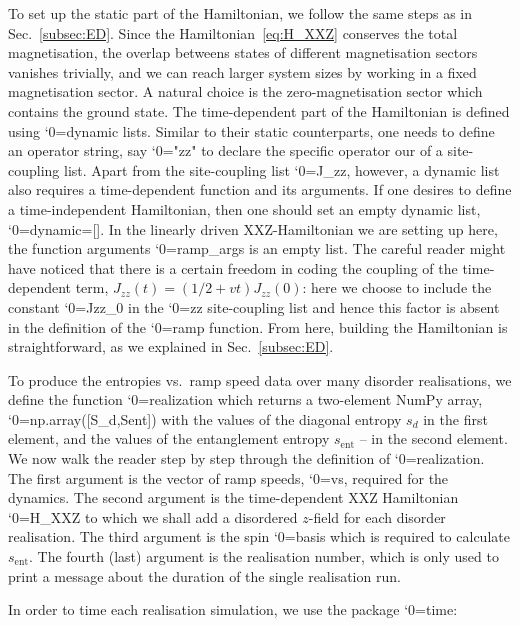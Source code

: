 \documentclass{SciPost}
\newcommand\0{\scalebox{-1}[1]{0}}
\let\svttfamily\ttfamily
\renewcommand\ttfamily{\svttfamily\catcode`0=\active }
\renewcommand\texttt{\bgroup\ttfamily\texttthelp}
\def\texttthelp#1{#1\egroup}
\begin{document}
To set up the static part of the Hamiltonian, we follow the same steps as in Sec.~\ref{subsec:ED}. Since the Hamiltonian~\eqref{eq:H_XXZ} conserves the total magnetisation, the overlap betweens states of different magnetisation sectors vanishes trivially, and we can reach larger system sizes by working in a fixed magnetisation sector. A natural choice is the zero-magnetisation sector which contains the ground state. The time-dependent part of the Hamiltonian is defined using \texttt{dynamic} lists. Similar to their static counterparts, one needs to define an operator string, say \texttt{"zz"} to declare the specific operator our of a site-coupling list. Apart from the site-coupling list \texttt{J\_zz}, however, a dynamic list also requires a time-dependent function and its arguments. If one desires to define a time-independent Hamiltonian, then one should set an empty dynamic list, \texttt{dynamic=[]}. In the linearly driven XXZ-Hamiltonian we are setting up here, the function arguments \texttt{ramp\_args} is an empty list. The careful reader might have noticed that there is a certain freedom in coding the coupling of the time-dependent term, $J_{zz}(t)=(1/2+vt)J_{zz}(0)$: here we choose to include the constant \texttt{Jzz\_0} in the \texttt{zz} site-coupling list and hence this factor is absent in the definition of the \texttt{ramp} function. From here, building the Hamiltonian is straightforward, as we explained in Sec.~\ref{subsec:ED}. 

% 
To produce the entropies vs.~ramp speed data over many disorder realisations, we define the function \texttt{realization} which returns a two-element NumPy array, \texttt{np.array([S\_d,Sent])} with the values of the diagonal entropy $s_d$ in the first element, and the values of the entanglement entropy $s_\mathrm{ent}$ -- in the second element. We now walk the reader step by step through the definition of \texttt{realization}. The first argument is the vector of ramp speeds, \texttt{vs}, required for the dynamics. The second argument is the time-dependent XXZ Hamiltonian \texttt{H\_XXZ} to which we shall add a disordered $z$-field for each disorder realisation. The third argument is the spin \texttt{basis} which is required to calculate $s_\mathrm{ent}$. The fourth (last) argument is the realisation number, which is only used to print a message about the duration of the single realisation run. 

%
In order to time each realisation simulation, we use the package \texttt{time}:
\end{document}
